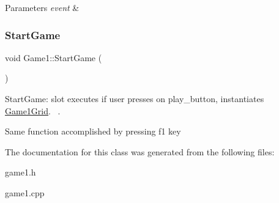 \begin{DoxyParams}{Parameters}
{\em event} & \\
\hline
\end{DoxyParams}
\mbox{\label{classGame1_aaba43ec7b8b814a74dd701e4502c40bb}} 
\subsubsection{\texorpdfstring{Start\+Game}{StartGame}}
{\footnotesize\ttfamily void Game1\+::\+Start\+Game (\begin{DoxyParamCaption}{ }\end{DoxyParamCaption})\hspace{0.3cm}{\ttfamily [slot]}}



Start\+Game\+: slot executes if user presses on play\+\_\+button, instantiates \hyperlink{classGame1Grid}{Game1\+Grid}.~\newline
. 

Same function accomplished by pressing f1 key 

The documentation for this class was generated from the following files\+:\begin{DoxyCompactItemize}
\item 
game1.\+h\item 
game1.\+cpp\end{DoxyCompactItemize}
